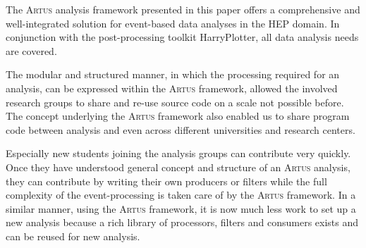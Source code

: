 \documentclass[3p]{elsarticle}
\newcommand{\software}[1]{\textsc{#1}\xspace}
\newcommand{\artus}{\software{Artus}}
\begin{document}
The \artus analysis framework presented in this paper offers a comprehensive and well-integrated solution for event-based data analyses in the HEP domain.
In conjunction with the post-processing toolkit HarryPlotter, all data analysis needs are covered.

The modular and structured manner, in which the processing required for an analysis, can be expressed within the \artus framework, allowed the involved research groups to share and re-use source code on a scale not possible before.
The concept underlying the \artus framework also enabled us to share program code between analysis and even across different universities and research centers.

Especially new students joining the analysis groups can contribute very quickly.
Once they have understood general concept and structure of an \artus analysis, they can contribute by writing their own producers or filters while the full complexity of the event-processing is taken care of by the \artus framework.
In a similar manner, using the \artus framework, it is now much less work to set up a new analysis because a rich library of processors, filters and consumers exists and can be reused for new analysis.

\vspace{2cm}

\end{document}
